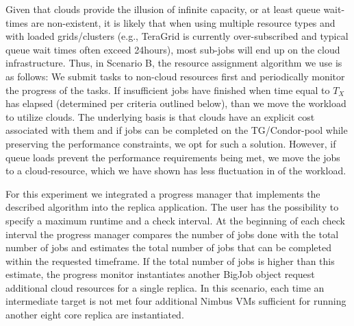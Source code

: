 \documentclass[graybox]{svmult}
\begin{document}
Given that clouds provide the illusion of infinite capacity, or at
least queue wait-times are non-existent, it is likely that when using
multiple resource types and with loaded grids/clusters (e.g., TeraGrid
is currently over-subscribed and typical queue wait times often exceed
24hours), most sub-jobs will end up on the cloud infrastructure.
Thus, in Scenario B, the resource assignment algorithm we use is as
follows: We submit tasks to non-cloud resources first and periodically
monitor the progress of the tasks. If insufficient jobs have finished
when time equal to $T_{X}$ has elapsed (determined per criteria
outlined below),
than we move the workload to utilize clouds.  The underlying basis is
that clouds have an explicit cost associated with them and if jobs can
be completed on the TG/Condor-pool while preserving the performance
constraints, we opt for such a solution. However, if queue loads
prevent the performance requirements being met, we move the jobs to a
cloud-resource, which we have shown has less fluctuation in \tc of the
workload.

For this experiment we integrated a progress manager that implements
the described algorithm into the replica application.  The user has
the possibility to specify a maximum runtime and a check interval.  At
the beginning of each check interval the progress manager compares the
number of jobs done with the total number of jobs and estimates the
total number of jobs that can be completed within the requested
timeframe. If the total number of jobs is higher than this estimate,
the progress monitor instantiates another BigJob object request
additional cloud resources for a single replica.  In this scenario,
each time an intermediate target is not met four additional Nimbus VMs
sufficient for running another eight core replica are instantiated.

\end{document}
